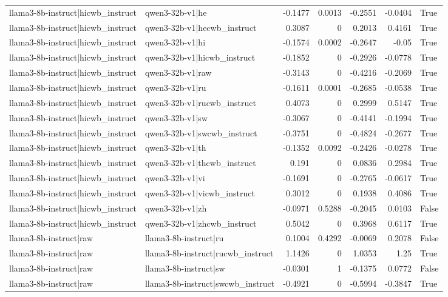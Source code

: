 \begin{table}
\begin{tabular}{l l r r r r l}
llama3-8b-instruct|hicwb_instruct & qwen3-32b-v1|he & -0.1477 & 0.0013 & -0.2551 & -0.0404 & True \\
llama3-8b-instruct|hicwb_instruct & qwen3-32b-v1|hecwb_instruct & 0.3087 & 0 & 0.2013 & 0.4161 & True \\
llama3-8b-instruct|hicwb_instruct & qwen3-32b-v1|hi & -0.1574 & 0.0002 & -0.2647 & -0.05 & True \\
llama3-8b-instruct|hicwb_instruct & qwen3-32b-v1|hicwb_instruct & -0.1852 & 0 & -0.2926 & -0.0778 & True \\
llama3-8b-instruct|hicwb_instruct & qwen3-32b-v1|raw & -0.3143 & 0 & -0.4216 & -0.2069 & True \\
llama3-8b-instruct|hicwb_instruct & qwen3-32b-v1|ru & -0.1611 & 0.0001 & -0.2685 & -0.0538 & True \\
llama3-8b-instruct|hicwb_instruct & qwen3-32b-v1|rucwb_instruct & 0.4073 & 0 & 0.2999 & 0.5147 & True \\
llama3-8b-instruct|hicwb_instruct & qwen3-32b-v1|sw & -0.3067 & 0 & -0.4141 & -0.1994 & True \\
llama3-8b-instruct|hicwb_instruct & qwen3-32b-v1|swcwb_instruct & -0.3751 & 0 & -0.4824 & -0.2677 & True \\
llama3-8b-instruct|hicwb_instruct & qwen3-32b-v1|th & -0.1352 & 0.0092 & -0.2426 & -0.0278 & True \\
llama3-8b-instruct|hicwb_instruct & qwen3-32b-v1|thcwb_instruct & 0.191 & 0 & 0.0836 & 0.2984 & True \\
llama3-8b-instruct|hicwb_instruct & qwen3-32b-v1|vi & -0.1691 & 0 & -0.2765 & -0.0617 & True \\
llama3-8b-instruct|hicwb_instruct & qwen3-32b-v1|vicwb_instruct & 0.3012 & 0 & 0.1938 & 0.4086 & True \\
llama3-8b-instruct|hicwb_instruct & qwen3-32b-v1|zh & -0.0971 & 0.5288 & -0.2045 & 0.0103 & False \\
llama3-8b-instruct|hicwb_instruct & qwen3-32b-v1|zhcwb_instruct & 0.5042 & 0 & 0.3968 & 0.6117 & True \\
llama3-8b-instruct|raw & llama3-8b-instruct|ru & 0.1004 & 0.4292 & -0.0069 & 0.2078 & False \\
llama3-8b-instruct|raw & llama3-8b-instruct|rucwb_instruct & 1.1426 & 0 & 1.0353 & 1.25 & True \\
llama3-8b-instruct|raw & llama3-8b-instruct|sw & -0.0301 & 1 & -0.1375 & 0.0772 & False \\
llama3-8b-instruct|raw & llama3-8b-instruct|swcwb_instruct & -0.4921 & 0 & -0.5994 & -0.3847 & True \\

\end{tabular}
\end{table}
